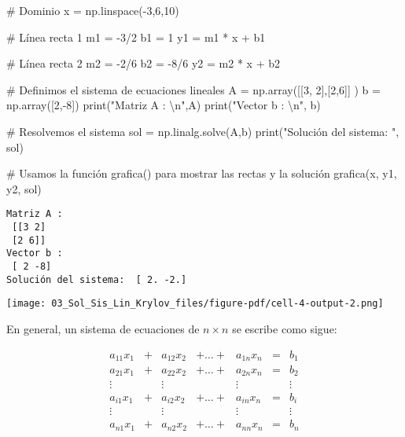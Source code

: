 \documentclass[
  letterpaper,
  DIV=11,
  numbers=noendperiod]{scrreprt}
\newenvironment{Shaded}{\begin{snugshade}}{\end{snugshade}}
\newcommand{\BuiltInTok}[1]{\textcolor[rgb]{0.00,0.23,0.31}{#1}}
\newcommand{\CharTok}[1]{\textcolor[rgb]{0.13,0.47,0.30}{#1}}
\newcommand{\CommentTok}[1]{\textcolor[rgb]{0.37,0.37,0.37}{#1}}
\newcommand{\DecValTok}[1]{\textcolor[rgb]{0.68,0.00,0.00}{#1}}
\newcommand{\NormalTok}[1]{\textcolor[rgb]{0.00,0.23,0.31}{#1}}
\newcommand{\OperatorTok}[1]{\textcolor[rgb]{0.37,0.37,0.37}{#1}}
\newcommand{\StringTok}[1]{\textcolor[rgb]{0.13,0.47,0.30}{#1}}
\begin{document}
\begin{Shaded}
\begin{Highlighting}[]
\CommentTok{\# Dominio}
\NormalTok{x }\OperatorTok{=}\NormalTok{ np.linspace(}\OperatorTok{{-}}\DecValTok{3}\NormalTok{,}\DecValTok{6}\NormalTok{,}\DecValTok{10}\NormalTok{)}

\CommentTok{\# Línea recta 1}
\NormalTok{m1 }\OperatorTok{=} \OperatorTok{{-}}\DecValTok{3}\OperatorTok{/}\DecValTok{2}
\NormalTok{b1 }\OperatorTok{=} \DecValTok{1}
\NormalTok{y1 }\OperatorTok{=}\NormalTok{ m1 }\OperatorTok{*}\NormalTok{ x }\OperatorTok{+}\NormalTok{ b1}

\CommentTok{\# Línea recta 2}
\NormalTok{m2 }\OperatorTok{=} \OperatorTok{{-}}\DecValTok{2}\OperatorTok{/}\DecValTok{6}
\NormalTok{b2 }\OperatorTok{=} \OperatorTok{{-}}\DecValTok{8}\OperatorTok{/}\DecValTok{6}
\NormalTok{y2 }\OperatorTok{=}\NormalTok{ m2 }\OperatorTok{*}\NormalTok{ x }\OperatorTok{+}\NormalTok{ b2 }

\CommentTok{\# Definimos el sistema de ecuaciones lineales}
\NormalTok{A }\OperatorTok{=}\NormalTok{ np.array([[}\DecValTok{3}\NormalTok{, }\DecValTok{2}\NormalTok{],[}\DecValTok{2}\NormalTok{,}\DecValTok{6}\NormalTok{]] )}
\NormalTok{b }\OperatorTok{=}\NormalTok{ np.array([}\DecValTok{2}\NormalTok{,}\OperatorTok{{-}}\DecValTok{8}\NormalTok{])}
\BuiltInTok{print}\NormalTok{(}\StringTok{"Matriz A : }\CharTok{\textbackslash{}n}\StringTok{"}\NormalTok{,A)}
\BuiltInTok{print}\NormalTok{(}\StringTok{"Vector b : }\CharTok{\textbackslash{}n}\StringTok{"}\NormalTok{, b)}

\CommentTok{\# Resolvemos el sistema}
\NormalTok{sol }\OperatorTok{=}\NormalTok{ np.linalg.solve(A,b)}
\BuiltInTok{print}\NormalTok{(}\StringTok{"Solución del sistema: "}\NormalTok{, sol)}

\CommentTok{\# Usamos la función grafica() para mostrar las rectas y la solución}
\NormalTok{grafica(x, y1, y2, sol)}
\end{Highlighting}
\end{Shaded}

\begin{verbatim}
Matriz A : 
 [[3 2]
 [2 6]]
Vector b : 
 [ 2 -8]
Solución del sistema:  [ 2. -2.]
\end{verbatim}

\texttt{[image: 03\_Sol\_Sis\_Lin\_Krylov\_files/figure-pdf/cell-4-output-2.png]}

En general, un sistema de ecuaciones de \(n \times n\) se escribe como
sigue:

\[
\begin{array}{ccccccc}
a_{11}x_1 & + & a_{12}x_2 & +  \dots  + & a_{1n}x_n & = & b_1 \\
a_{21}x_1 & + & a_{22}x_2 & +  \dots + & a_{2n}x_n & = & b_2 \\
\vdots & & \vdots &  & \vdots & & \vdots \\
a_{i1}x_1 & + & a_{i2}x_2 & +  \dots + & a_{in}x_n & = & b_i \\
\vdots & & \vdots &  & \vdots & & \vdots \\
a_{n1}x_1 & + & a_{n2}x_2 & + \dots + & a_{nn}x_n & = & b_n
\end{array}
\]
\end{document}
